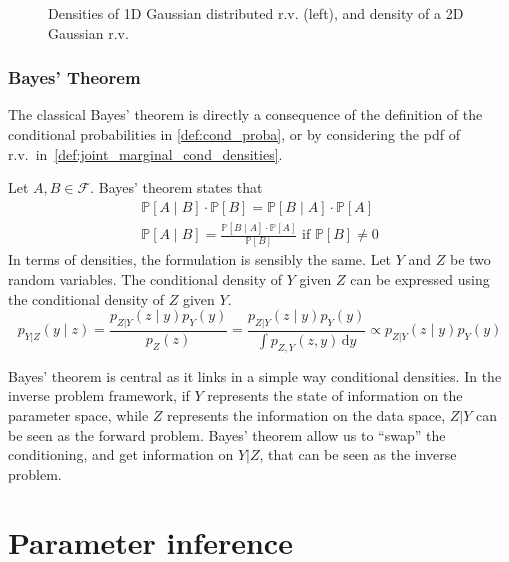 \documentclass[a4paper,11pt]{article}
\newcommand{\Prob}{\mathbb{P}}
\theoremstyle{defi}
\numberwithin{thmCounter}{section}
\begin{document}
\begin{figure}[!h]
  \centering
  
  \caption{Densities of 1D Gaussian distributed r.v. (left), and density of a 2D Gaussian r.v.}
  \label{fig:example_normal}
\end{figure}

\subsubsection{Bayes' Theorem}
\label{ssec:bayes_theorem}

The classical Bayes' theorem is directly a consequence of the definition of the conditional probabilities in \cref{def:cond_proba}, or by considering the pdf of r.v.\ in~\cref{def:joint_marginal_cond_densities}.

\begin{theorem}
  Let $A, B\in\mathcal{F}$. Bayes' theorem states that
  \begin{align*}
    \Prob[A\mid B]\cdot \Prob[B] = \Prob[B \mid A]\cdot\Prob[A] \\
    \Prob[A \mid B] = \frac{\Prob[B \mid A]\cdot\Prob[A]}{\Prob[B]} \text{ if } \Prob[B] \neq 0
  \end{align*}
 In terms of densities, the formulation is sensibly the same.
  Let $Y$ and $Z$ be two random variables. The conditional density of $Y$ given $Z$ can be expressed using the conditional density of $Z$ given $Y$.
  \begin{equation*}
    p_{Y|Z}(y \mid z) = \frac{p_{Z|Y}(z\mid y) p_Y(y)}{p_Z(z)} = \frac{p_{Z|Y}(z\mid y) p_Y(y)}{\int p_{Z,Y}(z,y) \,\mathrm{d}y}  \propto p_{Z|Y}(z\mid y) p_Y(y)
  \end{equation*}
\end{theorem}
Bayes' theorem is central as it links in a simple way conditional densities. In the inverse problem framework, if $Y$ represents the state of information on the parameter space, while $Z$ represents the information on the data space, $Z|Y$ can be seen as the forward problem. Bayes' theorem allow us to ``swap'' the conditioning, and get information on $Y|Z$, that can be seen as the inverse problem.

\section{Parameter inference}
\end{document}

